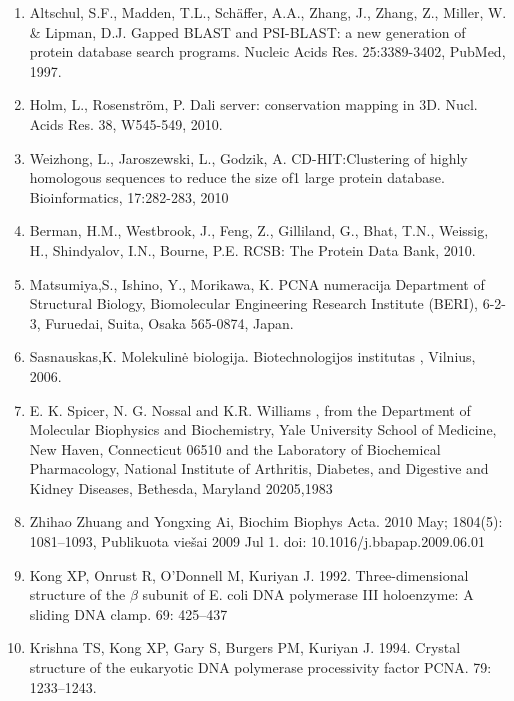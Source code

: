 \documentclass[a4paper,12pt]{article}
\begin{document}
\begin{enumerate}
	\item Altschul, S.F., Madden, T.L., Schäffer, A.A., Zhang, J., Zhang, Z., Miller, W. \& Lipman, D.J. Gapped BLAST and PSI-BLAST: a new generation of protein database search programs. Nucleic Acids Res. 25:3389-3402, PubMed, 1997.
	
	\item Holm, L., Rosenström, P. Dali server: conservation mapping in 3D. Nucl. Acids Res. 38, W545-549, 2010. 
	
	\item Weizhong, L., Jaroszewski, L., Godzik, A. CD-HIT:Clustering of highly homologous sequences to reduce the size of1 large protein database. Bioinformatics,  17:282-283, 2010
	\item Berman, H.M., Westbrook, J., Feng, Z., Gilliland, G., Bhat, T.N., Weissig, H., Shindyalov, I.N., Bourne, P.E. RCSB: The Protein Data Bank, 2010. 
	
	\item Matsumiya,S., Ishino, Y., Morikawa, K. PCNA numeracija Department of Structural Biology, Biomolecular Engineering Research Institute (BERI), 6-2-3, Furuedai, Suita, Osaka 565-0874, Japan.
	
	\item Sasnauskas,K. Molekulinė biologija. Biotechnologijos institutas , Vilnius, 2006.
	
	\item  E. K. Spicer, N. G. Nossal and K.R. Williams , from the Department of Molecular Biophysics and Biochemistry, Yale University School of Medicine, New Haven, Connecticut 06510 and the Laboratory of Biochemical Pharmacology, National Institute of Arthritis, Diabetes, and Digestive and Kidney Diseases, Bethesda, Maryland 20205,1983
	
	\item \hypertarget{Zhihao}{Zhihao Zhuang and Yongxing Ai, Biochim Biophys Acta. 2010 May; 1804(5): 1081–1093, Publikuota viešai 2009 Jul 1. doi: 10.1016/j.bbapap.2009.06.01}
	
	\item \hypertarget{Kong}{Kong XP, Onrust R, O’Donnell M, Kuriyan J. 1992. Three-dimensional structure of the $\beta$ subunit of E. coli DNA polymerase III holoenzyme: A sliding DNA clamp. 69: 425–437}
	
	\item Krishna TS, Kong XP, Gary S, Burgers PM, Kuriyan J. 1994. Crystal structure of the eukaryotic DNA polymerase processivity factor PCNA. 79: 1233–1243.
	

\end{enumerate}
\end{document}
